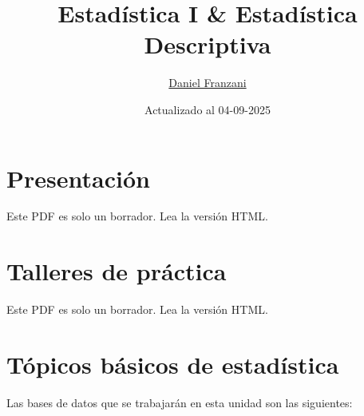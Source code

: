 \documentclass[
  11pt,
]{book}
\title{Estadística I \& Estadística Descriptiva}
\author{\href{https://dfranzani.github.io/website/principal/home.html}{Daniel Franzani}}
\date{Actualizado al 04-09-2025}
\theoremstyle{definition}
\theoremstyle{definition}
\theoremstyle{definition}
\theoremstyle{definition}
\theoremstyle{remark}
\begin{document}
\maketitle

{
\setcounter{tocdepth}{3}
\tableofcontents
}
\chapter*{Presentación}\label{presetacion}

Este PDF es solo un borrador. Lea la versión HTML.

\chapter*{Talleres de práctica}\label{talleres}

Este PDF es solo un borrador. Lea la versión HTML.

\chapter{Tópicos básicos de estadística}\label{unidad1}

Las bases de datos que se trabajarán en esta unidad son las siguientes:
\end{document}
